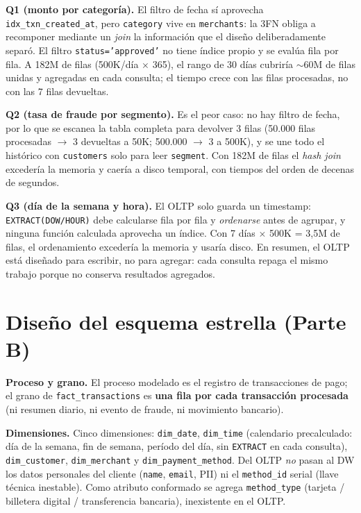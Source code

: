 \documentclass[10pt]{article}
\begin{document}
\textbf{Q1 (monto por categoría).} El filtro de fecha sí aprovecha \texttt{idx\_txn\_created\_at}, pero \texttt{category} vive en \texttt{merchants}: la 3FN obliga a recomponer mediante un \emph{join} la información que el diseño deliberadamente separó. El filtro \texttt{status='approved'} no tiene índice propio y se evalúa fila por fila. A 182M de filas (500K/día $\times$ 365), el rango de 30 días cubriría $\sim$60M de filas unidas y agregadas en cada consulta; el tiempo crece con las filas procesadas, no con las 7 filas devueltas.

\textbf{Q2 (tasa de fraude por segmento).} Es el peor caso: no hay filtro de fecha, por lo que se escanea la tabla completa para devolver 3 filas (50.000 filas procesadas $\rightarrow$ 3 devueltas a 50K; 500.000 $\rightarrow$ 3 a 500K), y se une todo el histórico con \texttt{customers} solo para leer \texttt{segment}. Con 182M de filas el \emph{hash join} excedería la memoria y caería a disco temporal, con tiempos del orden de decenas de segundos.

\textbf{Q3 (día de la semana y hora).} El OLTP solo guarda un timestamp: \texttt{EXTRACT(DOW/HOUR)} debe calcularse fila por fila y \emph{ordenarse} antes de agrupar, y ninguna función calculada aprovecha un índice. Con 7 días $\times$ 500K = 3{,}5M de filas, el ordenamiento excedería la memoria y usaría disco. En resumen, el OLTP está diseñado para escribir, no para agregar: cada consulta repaga el mismo trabajo porque no conserva resultados agregados.

\section{Diseño del esquema estrella (Parte B)}

\textbf{Proceso y grano.} El proceso modelado es el registro de transacciones de pago; el grano de \texttt{fact\_transactions} es \textbf{una fila por cada transacción procesada} (ni resumen diario, ni evento de fraude, ni movimiento bancario).

\textbf{Dimensiones.} Cinco dimensiones: \texttt{dim\_date}, \texttt{dim\_time} (calendario precalculado: día de la semana, fin de semana, período del día, sin \texttt{EXTRACT} en cada consulta), \texttt{dim\_customer}, \texttt{dim\_merchant} y \texttt{dim\_payment\_method}. Del OLTP \emph{no} pasan al DW los datos personales del cliente (\texttt{name}, \texttt{email}, PII) ni el \texttt{method\_id} serial (llave técnica inestable). Como atributo conformado se agrega \texttt{method\_type} (tarjeta / billetera digital / transferencia bancaria), inexistente en el OLTP.
\end{document}

